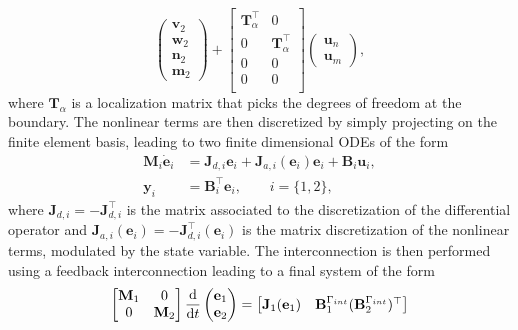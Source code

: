 \documentclass[11pt,a4paper]{article}
\begin{document}
{\begin{equation}
    \begin{pmatrix}
        \mathbf{v}_2 \\
        \mathbf{w}_2 \\
        \mathbf{n}_2 \\
        \mathbf{m}_2
    \end{pmatrix} + \begin{bmatrix}
        \mathbf{T}_\alpha^\top & 0 \\
        0 & \mathbf{T}_\alpha^\top \\
        0 & 0 \\
        0 & 0 \\
    \end{bmatrix}\begin{pmatrix}
        \mathbf{u}_n \\
        \mathbf{u}_m
    \end{pmatrix},
\end{equation}
where $\mathbf{T}_\alpha$ is a localization matrix that picks the degrees of freedom at the boundary. 
The nonlinear terms are then discretized by simply projecting on the finite element basis, leading to two finite dimensional ODEs of the form
$$
\begin{aligned}
   \mathbf{M}_i \dot{\mathbf{e}}_i &= \mathbf{J}_{d, i}\mathbf{e}_i + \mathbf{J}_{a, i}(\mathbf{e}_i)\mathbf{e}_i + \mathbf{B}_i \mathbf{u}_i, \\
   \mathbf{y}_i &= \mathbf{B}_i^\top \mathbf{e}_i, \qquad  i=\{1,2\}, 
\end{aligned}
$$
where $\mathbf{J}_{d, i}= - \mathbf{J}_{d, i}^\top$ is the matrix associated to the discretization of the differential operator and $\mathbf{J}_{a, i}(\mathbf{e}_i)= - \mathbf{J}_{d, i}^\top(\mathbf{e}_i)$ is the matrix discretization of the nonlinear terms, modulated by the state variable. The interconnection is then performed using a feedback interconnection leading to a final system of the form
$$
\begin{bmatrix}
    \mathbf{M}_1 & 0 \\
    0 & \mathbf{M}_2
\end{bmatrix}
\odv{}{t}\begin{pmatrix}
    \mathbf{e}_1 \\
    \mathbf{e}_2 \\
\end{pmatrix} = 
\begin{bmatrix}
    \mathbf{J}_1(\mathbf{e}_1) & \mathbf{B}_1^{\Gamma_{\rm int}} (\mathbf{B}_2^{\Gamma_{\rm int}})^\top \\

\end{bmatrix}$$}
\end{document}
